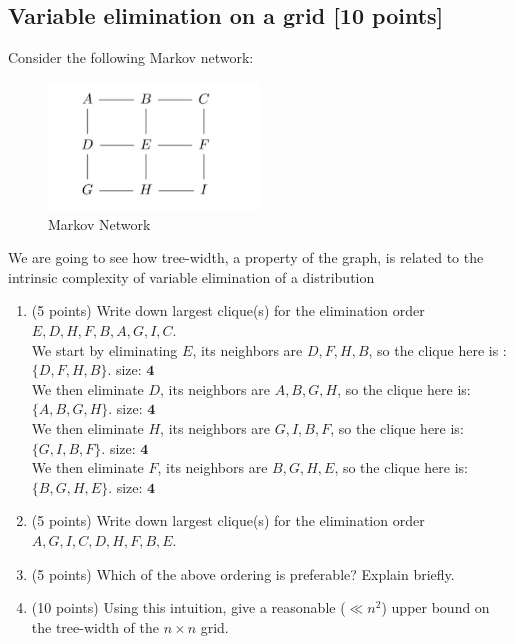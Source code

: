 \documentclass[a3paper,12pt]{extarticle} %
\begin{document}
\subsection{Variable elimination on a grid [10 points]}
Consider the following Markov network:
\begin{figure}[h]
    \centering
    \includegraphics[width=0.5\textwidth]{bn4.png}
    \caption{Markov Network}
\end{figure}

We are going to see how tree-width, a property of the graph, is related to the intrinsic complexity of
variable elimination of a distribution

\begin{enumerate}
\item (5 points) Write down largest clique(s) for the elimination order \(E, D, H, F, B, A, G, I, C\).
\\ We start by eliminating \(E\), its neighbors are \(D, F, H, B\), so the clique here is :\(\{D, F, H, B\}\). size: \(\textbf{4}\)
\\ We then eliminate \(D\), its neighbors are \(A, B, G, H\), so the clique here is: \(\{A, B, G, H\}\). size: \(\textbf{4}\)
\\ We then eliminate \(H\), its neighbors are \(G, I, B, F\), so the clique here is: \(\{G, I, B, F\}\). size: \(\textbf{4}\)
\\ We then eliminate \(F\), its neighbors are \(B, G, H, E\), so the clique here is: \(\{B, G, H, E\}\). size: \(\textbf{4}\)

\item (5 points) Write down largest clique(s) for the elimination order \(A, G, I, C, D, H, F, B, E\).

\item (5 points) Which of the above ordering is preferable? Explain briefly.

\item (10 points) Using this intuition, give a reasonable (\(\ll n^2\)) upper bound on the tree-width of the \(n \times n\) grid.

\end{enumerate}
\end{document}
